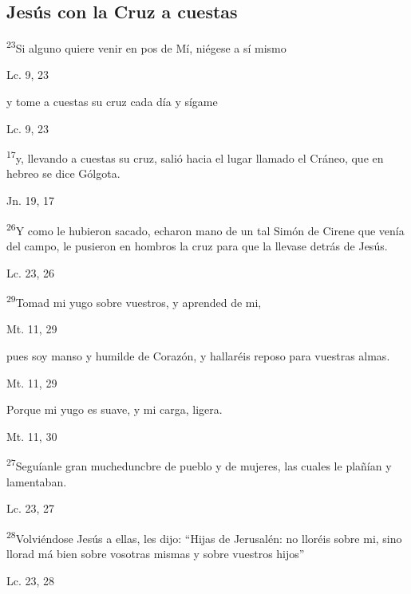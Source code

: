 \documentclass[a4paper,11pt,sans]{article}
\begin{document}
    \subsection*{\hfil Jesús con la Cruz a cuestas \hfil}
      
      \textsuperscript{23}Si alguno quiere venir en pos de Mí, niégese a sí mismo
      \begin{center}
        Lc. 9, 23
      \end{center}

      y tome a cuestas su cruz cada día y sígame
      \begin{center}
        Lc. 9, 23
      \end{center}

      \textsuperscript{17}y, llevando a cuestas su cruz, salió hacia el lugar llamado el Cráneo, que en hebreo se dice Gólgota.
      \begin{center}
        Jn. 19, 17
      \end{center}

      \textsuperscript{26}Y como le hubieron sacado, echaron mano de un tal Simón de Cirene que venía del campo, le pusieron en hombros la cruz para que la llevase
      detrás de Jesús.
      \begin{center}
        Lc. 23, 26
      \end{center}

      \textsuperscript{29}Tomad mi yugo sobre vuestros, y aprended de mi, 
      \begin{center}
        Mt. 11, 29  
      \end{center}

      pues soy manso y humilde de Corazón, y hallaréis reposo para vuestras almas.
      \begin{center}
        Mt. 11, 29
      \end{center}

      Porque mi yugo es suave, y mi carga, ligera.
      \begin{center}
        Mt. 11, 30
      \end{center}

      \textsuperscript{27}Seguíanle gran mucheduncbre de pueblo y de mujeres, las cuales le plañían y lamentaban.
      \begin{center}
        Lc. 23, 27
      \end{center}

      \textsuperscript{28}Volviéndose Jesús a ellas, les dijo: ``Hijas de Jerusalén: no lloréis sobre mi, sino llorad má bien sobre vosotras mismas y sobre
      vuestros hijos''
      \begin{center}
        Lc. 23, 28
      \end{center}
\end{document}
